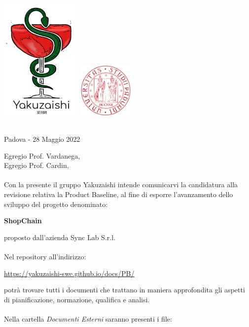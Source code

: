 \documentclass[a4paper, 10pt]{article}
\begin{document}
\begin{center}
\includegraphics[width=0.3\textwidth]{../template/images/logo.png}
\hspace{3cm}
\includegraphics[width=0.2\textwidth]{../template/images/logoUnipd.png}\\
\end{center}
\begin{flushright}
    \
    \textbf{}\\
    Padova - 28 Maggio 2022
\end{flushright}
Egregio Prof. Vardanega,\\
Egregio Prof. Cardin,\\\\
Con la presente il gruppo Yakuzaishi intende comunicarvi la candidatura alla revisione relativa la Product Baseline, al fine di esporre l'avanzamento dello sviluppo del progetto denominato:
\begin{center}
    \textbf{ShopChain}
\end{center}
proposto dall'azienda Sync Lab S.r.l.\\\\
Nel repository all'indirizzo:
\begin{center}
    \href{https://yakuzaishi-swe.github.io/docs/PB/}{\underline{https://yakuzaishi-swe.github.io/docs/PB/}}\\ 
\end{center}
potrà trovare tutti i documenti che trattano in maniera approfondita gli aspetti di pianificazione, normazione, qualifica e analisi.\\\\
Nella cartella \textit{Documenti Esterni} saranno presenti i file:
\end{document}
